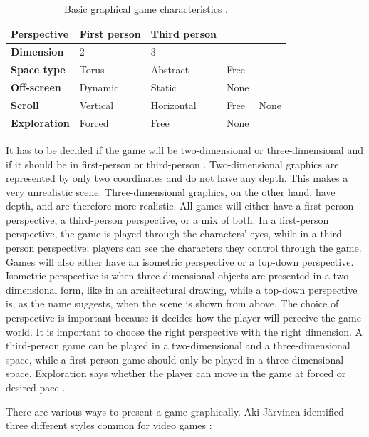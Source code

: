 \begin{table}
\centering
    \begin{tabular}{|l|l|l|l|l|}
        \hline
       \textbf{Perspective} & First person & Third person & &  \\ \hline
       \textbf{Dimension} & 2 & 3 & & \\ \hline
       \textbf{Space type} & Torus & Abstract & Free & \\ \hline
	   \textbf{Off-screen} & Dynamic & Static & None & \\ \hline
	   \textbf{Scroll} & Vertical & Horizontal & Free & None \\ \hline
	   \textbf{Exploration} & Forced & Free & None & \\
        \hline
    \end{tabular}
    \caption[Graphical Characteristics]{Basic graphical game characteristics \cite{understandingvg}.}
    \label{tab:graphic}
\end{table} 

It has to be decided if the game will be two-dimensional or three-dimensional and if it should be in first-person or third-person \cite{understandingvg}. Two-dimensional graphics are represented by only two coordinates and do not have any depth. This makes a very unrealistic scene. Three-dimensional graphics, on the other hand, have depth, and are therefore more realistic. All games will either have a first-person perspective, a third-person perspective, or a mix of both. In a first-person perspective, the game is played through the characters' eyes, while in a third-person perspective; players can see the characters they control through the game. Games will also either have an isometric perspective or a top-down perspective. Isometric perspective is when three-dimensional objects are presented in a two-dimensional form, like in an architectural drawing, while a top-down perspective is, as the name suggests, when the scene is shown from above. The choice of perspective is important because it decides how the player will perceive the game world. It is important to choose the right perspective with the right dimension. A third-person game can be played in a two-dimensional and a three-dimensional space, while a first-person game should only be played in a three-dimensional space. Exploration says whether the player can move in the game at forced or desired pace \cite{understandingvg}.

There are various ways to present a game graphically. Aki Järvinen identified three different styles common for video games \cite{understandingvg}: 

